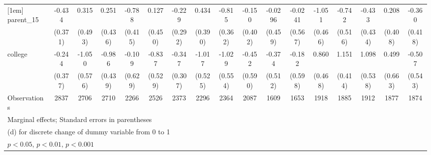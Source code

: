 {\begin{tabular}{l*{16}{c}}
[1em]
parent\_15           &      -0.434         &       0.315         &       0.251         &      -0.788         &       0.127         &      -0.229         &       0.434         &      -0.815\sym{*}  &      -0.150         &     -0.0296         &     -0.0241         &      -1.051\sym{*}  &      -0.742         &      -0.433         &       0.208         &      -0.360         \\
                    &     (0.371)         &     (0.493)         &     (0.436)         &     (0.415)         &     (0.450)         &     (0.292)         &     (0.390)         &     (0.362)         &     (0.402)         &     (0.459)         &     (0.567)         &     (0.466)         &     (0.516)         &     (0.434)         &     (0.408)         &     (0.418)         \\
[1em]
college             &      -0.244         &      -1.050         &      -0.986\sym{*}  &      -0.109         &      -0.837         &      -0.347         &      -1.017         &      -1.029         &      -0.452         &      -0.374         &      -0.182         &       0.860         &       1.151\sym{**} &       1.098\sym{*}  &       0.499         &      -0.507         \\
                    &     (0.377)         &     (0.576)         &     (0.439)         &     (0.629)         &     (0.529)         &     (0.307)         &     (0.525)         &     (0.554)         &     (0.590)         &     (0.512)         &     (0.598)         &     (0.468)         &     (0.414)         &     (0.538)         &     (0.663)         &     (0.543)         \\
\hline
Observations        &        2837         &        2706         &        2710         &        2266         &        2526         &        2373         &        2296         &        2364         &        2087         &        1609         &        1653         &        1918         &        1885         &        1912         &        1877         &        1874         \\
\hline\hline
\multicolumn{17}{l}{\footnotesize Marginal effects; Standard errors in parentheses}\\
\multicolumn{17}{l}{\footnotesize  (d) for discrete change of dummy variable from 0 to 1}\\
\multicolumn{17}{l}{\footnotesize \sym{*} \(p<0.05\), \sym{**} \(p<0.01\), \sym{***} \(p<0.001\)}\\
\end{tabular}
}
